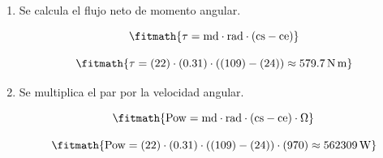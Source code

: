 \begin{enumerate}

\item Se calcula el flujo neto de momento angular.

\[\fitmath{\tau=\mathrm{md}\cdot \mathrm{rad}\cdot \left(\mathrm{cs}-\mathrm{ce}\right)}\]

\[\fitmath{\tau=(22)\cdot (0.31)\cdot \left((109)-(24)\right)\approx 579.7\,\mathrm{N\,m}}\]

\item Se multiplica el par por la velocidad angular.

\[\fitmath{\mathrm{Pow}=\mathrm{md}\cdot \mathrm{rad}\cdot \left(\mathrm{cs}-\mathrm{ce}\right)\cdot \Omega}\]

\[\fitmath{\mathrm{Pow}=(22)\cdot (0.31)\cdot \left((109)-(24)\right)\cdot (970)\approx 562309\,\mathrm{W}}\]

\end{enumerate}
